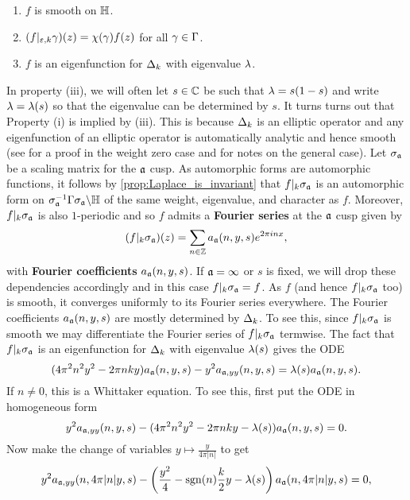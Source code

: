     \begin{enumerate}[label=(\roman*)]
      \item $f$ is smooth on $\mathbb{H}$.
      \item $(f|_{\varepsilon,k}\gamma)(z) = \chi(\gamma)f(z)$ for all $\gamma \in \Gamma$.
      \item $f$ is an eigenfunction for $\Delta_{k}$ with eigenvalue $\lambda$.
    \end{enumerate}
    In property (iii), we will often let $s \in \mathbb{C}$ be such that $\lambda = s(1-s)$ and write $\lambda = \lambda(s)$ so that the eigenvalue can be determined by $s$. It turns turns out that Property (i) is implied by (iii). This is because $\Delta_{k}$ is an elliptic operator and any eigenfunction of an elliptic operator is automatically analytic and hence smooth (see \cite{evans2022partial} for a proof in the weight zero case and \cite{duke2002subconvexity} for notes on the general case). Let $\sigma_{\mathfrak{a}}$ be a scaling matrix for the $\mathfrak{a}$ cusp. As automorphic forms are automorphic functions, it follows by \cref{prop:Laplace_is_invariant} that $f|_{k}\sigma_{\mathfrak{a}}$ is an automorphic form on $\sigma_{\mathfrak{a}}^{-1}\Gamma\sigma_{\mathfrak{a}}\backslash\mathbb{H}$ of the same weight, eigenvalue, and character as $f$. Moreover, $f|_{k}\sigma_{\mathfrak{a}}$ is also $1$-periodic and so $f$ admits a \textbf{Fourier series} at the $\mathfrak{a}$ cusp given by
    \[
      (f|_{k}\sigma_{\mathfrak{a}})(z) = \sum_{n \in \mathbb{Z}}a_{\mathfrak{a}}(n,y,s)e^{2\pi inx},
    \]
    with \textbf{Fourier coefficients} $a_{\mathfrak{a}}(n,y,s)$. If $\mathfrak{a} = \infty$ or $s$ is fixed, we will drop these dependencies accordingly and in this case $f|_{k}\sigma_{\mathfrak{a}} = f$. As $f$ (and hence $f|_{k}\sigma_{\mathfrak{a}}$ too) is smooth, it converges uniformly to its Fourier series everywhere. The Fourier coefficients $a_{\mathfrak{a}}(n,y,s)$ are mostly determined by $\Delta_{k}$. To see this, since $f|_{k}\sigma_{\mathfrak{a}}$ is smooth we may differentiate the Fourier series of $f|_{k}\sigma_{\mathfrak{a}}$ termwise. The fact that $f|_{k}\sigma_{\mathfrak{a}}$ is an eigenfunction for $\Delta_{k}$ with eigenvalue $\lambda(s)$ gives the ODE
    \[
      (4\pi^{2}n^{2}y^{2}-2\pi nky)a_{\mathfrak{a}}(n,y,s)-y^{2}a_{\mathfrak{a},yy}(n,y,s) = \lambda(s)a_{\mathfrak{a}}(n,y,s).
    \]
    If $n \neq 0$, this is a Whittaker equation. To see this, first put the ODE in homogeneous form
    \[
      y^{2}a_{\mathfrak{a},yy}(n,y,s)-(4\pi^{2}n^{2}y^{2}-2\pi nky-\lambda(s))a_{\mathfrak{a}}(n,y,s) = 0.
    \]
    Now make the change of variables $y \mapsto \frac{y}{4\pi|n|}$ to get
    \[
      y^{2}a_{\mathfrak{a},yy}(n,4\pi|n|y,s)-\left(\frac{y^{2}}{4}-\operatorname{\mathrm{sgn}}(n)\frac{k}{2}y-\lambda(s)\right)a_{\mathfrak{a}}(n,4\pi|n|y,s) = 0,
    \]
